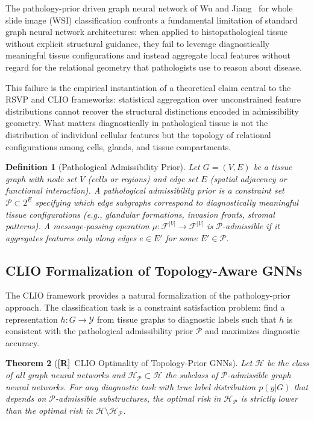\documentclass[11pt, oneside]{article}
\numberwithin{equation}{section}
\newcommand{\ClaimR}{\textcolor{rsvpblue}{\textbf{[R]}}}
\theoremstyle{rsvpstyle}
\newtheorem{theorem}{Theorem}[section]
\newtheorem{definition}[theorem]{Definition}
\theoremstyle{remark}
\begin{document}
The pathology-prior driven graph neural network of Wu and Jiang~\cite{Wu2026GNN} for
whole slide image (WSI) classification confronts a fundamental limitation of standard
graph neural network architectures: when applied to histopathological tissue without
explicit structural guidance, they fail to leverage diagnostically meaningful tissue
configurations and instead aggregate local features without regard for the relational
geometry that pathologists use to reason about disease.

This failure is the empirical instantiation of a theoretical claim central to the RSVP
and CLIO frameworks: statistical aggregation over unconstrained feature distributions
cannot recover the structural distinctions encoded in admissibility geometry. What
matters diagnostically in pathological tissue is not the distribution of individual
cellular features but the topology of relational configurations among cells, glands,
and tissue compartments.

\begin{definition}[Pathological Admissibility Prior]
Let $G = (V, E)$ be a tissue graph with node set $V$ (cells or regions) and edge set
$E$ (spatial adjacency or functional interaction). A pathological admissibility prior
is a constraint set $\mathcal{P} \subset 2^E$ specifying which edge subgraphs
correspond to diagnostically meaningful tissue configurations (e.g., glandular formations,
invasion fronts, stromal patterns). A message-passing operation $\mu : \mathcal{F}^{|V|}
\to \mathcal{F}^{|V|}$ is $\mathcal{P}$-admissible if it aggregates features only along
edges $e \in E'$ for some $E' \in \mathcal{P}$.
\end{definition}

\subsection{CLIO Formalization of Topology-Aware GNNs}

The CLIO framework provides a natural formalization of the pathology-prior approach.
The classification task is a constraint satisfaction problem: find a representation
$h : G \to \mathcal{Y}$ from tissue graphs to diagnostic labels such that $h$ is
consistent with the pathological admissibility prior $\mathcal{P}$ and maximizes
diagnostic accuracy.

\begin{theorem}[\ClaimR\ CLIO Optimality of Topology-Prior GNNs]
\label{thm:gnn-clio}
Let $\mathcal{H}$ be the class of all graph neural networks and $\mathcal{H}_\mathcal{P}
\subset \mathcal{H}$ the subclass of $\mathcal{P}$-admissible graph neural networks.
For any diagnostic task with true label distribution $p(y|G)$ that depends on
$\mathcal{P}$-admissible substructures, the optimal risk in $\mathcal{H}_\mathcal{P}$
is strictly lower than the optimal risk in $\mathcal{H} \setminus \mathcal{H}_\mathcal{P}$.
\end{theorem}
\end{document}
